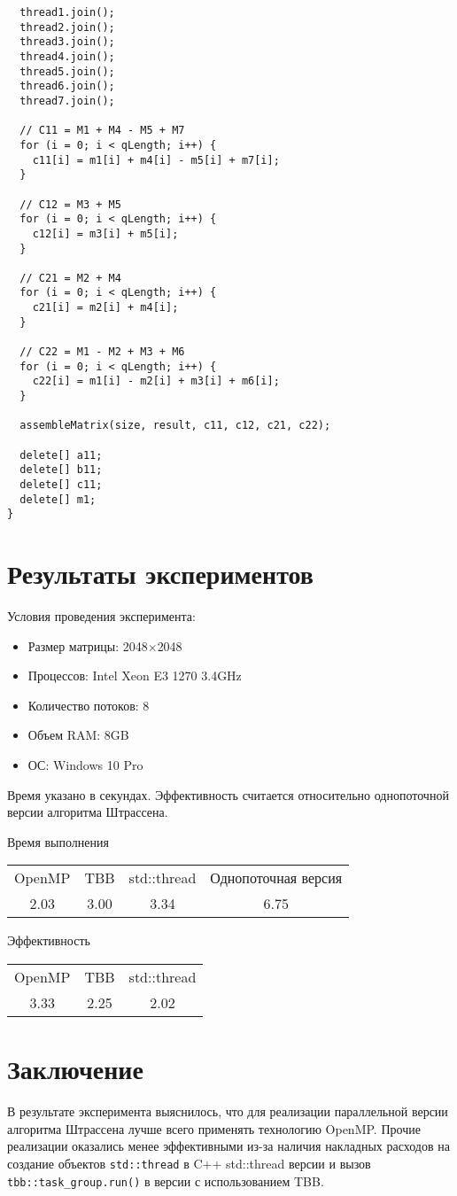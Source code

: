 \documentclass{report}
\begin{document}
\begin{lstlisting}
  thread1.join();
  thread2.join();
  thread3.join();
  thread4.join();
  thread5.join();
  thread6.join();
  thread7.join();

  // C11 = M1 + M4 - M5 + M7
  for (i = 0; i < qLength; i++) {
    c11[i] = m1[i] + m4[i] - m5[i] + m7[i];
  }

  // C12 = M3 + M5
  for (i = 0; i < qLength; i++) {
    c12[i] = m3[i] + m5[i];
  }

  // C21 = M2 + M4
  for (i = 0; i < qLength; i++) {
    c21[i] = m2[i] + m4[i];
  }

  // C22 = M1 - M2 + M3 + M6
  for (i = 0; i < qLength; i++) {
    c22[i] = m1[i] - m2[i] + m3[i] + m6[i];
  }

  assembleMatrix(size, result, c11, c12, c21, c22);

  delete[] a11;
  delete[] b11;
  delete[] c11;
  delete[] m1;
}
\end{lstlisting}


\newpage
\section{Результаты экспериментов}
\par Условия проведения эксперимента:
\begin{itemize}[label={}]
\item Размер матрицы: 2048$\times$2048
\item Процессов: Intel Xeon E3 1270 3.4GHz
\item Количество потоков: 8
\item Объем RAM: 8GB
\item ОС: Windows 10 Pro
\end{itemize}
\par Время указано в секундах. Эффективность считается относительно однопоточной версии алгоритма Штрассена.
\begin{center}
Время выполнения
\begin{tabular}{|c|c|c|c|}
OpenMP & TBB & std::thread & Однопоточная версия \\
2.03 & 3.00 & 3.34 & 6.75
\end{tabular}
Эффективность
\begin{tabular}{|c|c|c|}
OpenMP & TBB & std::thread \\
3.33 & 2.25 & 2.02
\end{tabular}
\end{center}

\newpage
\section{Заключение}
\par В результате эксперимента выяснилось, что для реализации параллельной версии алгоритма Штрассена лучше всего применять технологию OpenMP. Прочие реализации оказались менее эффективными из-за наличия накладных расходов на создание объектов \lstinline{std::thread} в C++ std::thread версии и вызов \lstinline{tbb::task_group.run()} в версии с использованием TBB.
\end{document}
